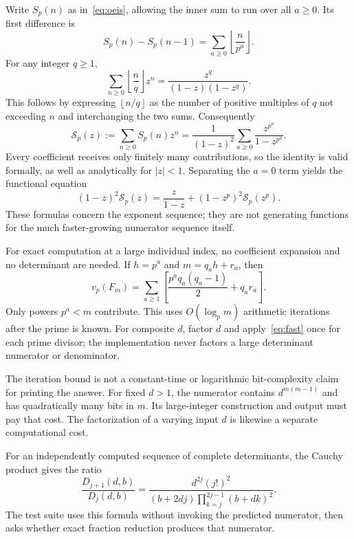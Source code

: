 \documentclass[11pt,a4paper]{article}
\theoremstyle{definition}
\theoremstyle{remark}
\newcommand{\sfac}{F}
\newcommand{\floor}[1]{\left\lfloor #1\right\rfloor}
\begin{document}
Write $S_p(n)$ as in~\eqref{eq:oeis}, allowing the inner sum to run over all
$a\ge0$. Its first difference is
\[
 S_p(n)-S_p(n-1)=\sum_{a\ge0}\floor{\frac n{p^a}}.
\]
For any integer $q\ge1$,
\[
 \sum_{n\ge0}\floor{\frac nq}z^n
 =\frac{z^q}{(1-z)(1-z^q)}.
\]
This follows by expressing $\floor{n/q}$ as the number of positive
multiples of $q$ not exceeding $n$ and interchanging the two sums.
Consequently
\begin{equation}
 \mathcal S_p(z):=\sum_{n\ge0}S_p(n)z^n
 =\frac1{(1-z)^2}\sum_{a\ge0}\frac{z^{p^a}}{1-z^{p^a}}.
 \label{eq:lambert}
\end{equation}
Every coefficient receives only finitely many contributions, so the
identity is valid formally, as well as analytically for $|z|<1$.
Separating the $a=0$ term yields the functional equation
\begin{equation}
 (1-z)^2\mathcal S_p(z)
 =\frac z{1-z}+(1-z^p)^2\mathcal S_p(z^p).
 \label{eq:mahler}
\end{equation}
These formulas concern the exponent sequence; they are not generating
functions for the much faster-growing numerator sequence itself.

For exact computation at a large individual index, no coefficient expansion
and no determinant are needed. If $h=p^a$ and $m=q_a h+r_a$, then
\begin{equation}
 v_p(\sfac_m)=\sum_{a\ge1}
 \left[\frac{p^a q_a(q_a-1)}2+q_a r_a\right].
 \label{eq:fast}
\end{equation}
Only powers $p^a<m$ contribute. This uses $O(\log_p m)$ arithmetic
iterations after the prime is known. For composite $d$, factor $d$ and
apply~\eqref{eq:fast} once for each prime divisor; the implementation never
factors a large determinant numerator or denominator.

The iteration bound is not a constant-time or logarithmic bit-complexity
claim for printing the answer. For fixed $d>1$, the numerator contains
$d^{m(m-1)}$ and has quadratically many bits in $m$. Its large-integer
construction and output must pay that cost. The factorization of a varying
input $d$ is likewise a separate computational cost.

For an independently computed sequence of complete determinants, the
Cauchy product gives the ratio
\begin{equation}
 \frac{D_{j+1}(d,b)}{D_j(d,b)}
 =\frac{d^{2j}(j!)^2}
 {(b+2dj)\displaystyle\prod_{k=j}^{2j-1}(b+dk)^2}.
 \label{eq:ratio}
\end{equation}
The test suite uses this formula without invoking the predicted numerator,
then asks whether exact fraction reduction produces that numerator.
\end{document}
